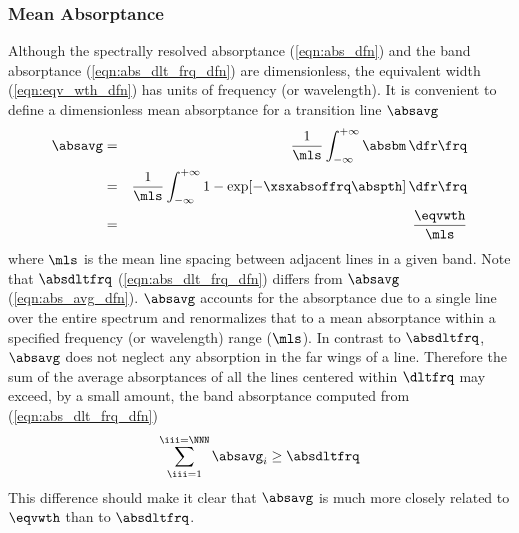 \documentclass[12pt]{article}
\begin{document}
\subsubsection[Mean Absorptance]{Mean Absorptance}\label{sxn:abs_avg}
Although the spectrally resolved absorptance (\ref{eqn:abs_dfn}) and
the band absorptance (\ref{eqn:abs_dlt_frq_dfn}) are dimensionless, the
equivalent width (\ref{eqn:eqv_wth_dfn}) has units of frequency (or
wavelength).   
It is convenient to define a dimensionless mean absorptance for a
transition line $\absavg$
\begin{eqnarray}
\absavg & = & \frac{1}{\mls} \int_{-\infty}^{+\infty} \absbm \,\dfr\frq
\nonumber \\
& = & \frac{1}{\mls} \int_{-\infty}^{+\infty}
1 - \exp[-\xsxabsoffrq \abspth] \,\dfr\frq
\nonumber \\
& = & \frac{\eqvwth}{\mls}
\label{eqn:abs_avg_dfn}
\end{eqnarray}
where $\mls$ is the mean line spacing between adjacent lines in a
given band.
Note that $\absdltfrq$ (\ref{eqn:abs_dlt_frq_dfn}) differs from
$\absavg$ (\ref{eqn:abs_avg_dfn}). 
$\absavg$ accounts for the absorptance due to a single line over the
entire spectrum and renormalizes that to a mean absorptance within
a specified frequency (or wavelength) range ($\mls$).
In contrast to $\absdltfrq$, $\absavg$ does not neglect any
absorption in the far wings of a line.
Therefore the sum of the average absorptances of all the lines
centered within $\dltfrq$ may exceed, by a small amount, the band 
absorptance computed from (\ref{eqn:abs_dlt_frq_dfn})
\begin{equation}
\sum_{\iii = 1}^{\iii = \NNN} \absavg_i \ge \absdltfrq
\label{eqn:absavg_absdlt}
\end{equation}
This difference should make it clear that $\absavg$ is much more
closely related to $\eqvwth$ than to $\absdltfrq$.
\end{document}
